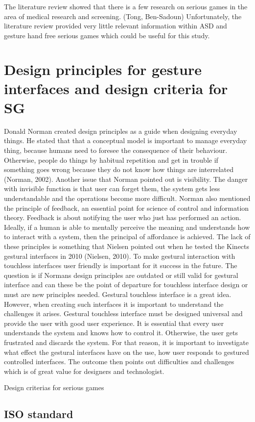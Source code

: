 The literature review showed that there is a few research on serious games in the area of medical research and screening. (Tong, Ben-Sadoun) Unfortunately, the literature review provided very little relevant information within ASD and gesture hand free serious games which could be useful for this study.



\section{Design principles for gesture interfaces and design criteria for SG}
\label{sec:designprinciples}
Donald Norman created design principles as a guide when designing everyday things. He stated that that a conceptual model is important to manage everyday thing, because humans need to foresee the consequence of their behaviour. Otherwise, people do things by habitual repetition and get in trouble if something goes wrong because they do not know how things are interrelated (Norman, 2002). Another issue that Norman pointed out is visibility. The danger with invisible function is that user can forget them, the system gets less understandable and the operations become more difficult. Norman also mentioned the principle of feedback, an essential point for science of control and information theory. Feedback is about notifying the user who just has performed an action. Ideally, if a human is able to mentally perceive the meaning and understands how to interact with a system, then the principal of affordance is achieved. The lack of these principles is something that Nielsen pointed out when he tested the Kinects gestural interfaces in 2010 (Nielsen, 2010).  To make gestural interaction with touchless interfaces user friendly is important for it success in the future. The question is if Normans design principles are outdated or still valid for gestural interface and can these be the point of departure for touchless interface design or must are new principles needed.
Gestural touchless interface is a great idea. However, when creating such interfaces it is important to understand the challenges it arises. Gestural touchless interface must be designed universal and provide the user with good user experience. It is essential that every user understands the system and knows how to control it. Otherwise, the user gets frustrated and discards the system. For that reason, it is important to investigate what effect the gestural interfaces have on the use, how user responds to gestured controlled interfaces. The outcome then points out difficulties and challenges which is of great value for designers and technologist.

Design criterias for serious games


\subsection{ISO standard}
\label{sec:isostandard}


